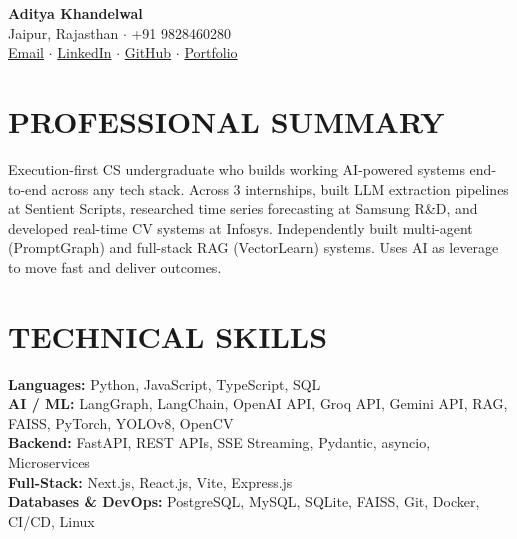 \documentclass[11pt,letterpaper]{article}
\newcommand{\skill}[2]{
  \textbf{#1:} #2 \\
}
\begin{document}
\noindent
\begin{minipage}[c]{0.75\textwidth}
    {\huge \textbf{Aditya Khandelwal}} \\[4pt]
    Jaipur, Rajasthan $\cdot$ +91 9828460280 \\[2pt]
    \href{mailto:adityakhandelwal0271@gmail.com}{Email} $\cdot$
    \href{https://www.linkedin.com/in/nvmaditya/}{LinkedIn} $\cdot$
    \href{https://github.com/nvmaditya}{GitHub} $\cdot$
    \href{https://theadityakhandelwal.in/}{Portfolio}
\end{minipage}%

\vspace{2.5pt}

\section{PROFESSIONAL SUMMARY}
Execution-first CS undergraduate who builds working AI-powered systems end-to-end across any tech stack. Across 3 internships, built LLM extraction pipelines at Sentient Scripts, researched time series forecasting at Samsung R\&D, and developed real-time CV systems at Infosys. Independently built multi-agent (PromptGraph) and full-stack RAG (VectorLearn) systems. Uses AI as leverage to move fast and deliver outcomes.

\section{TECHNICAL SKILLS}
\skill{Languages}{Python, JavaScript, TypeScript, SQL}
\skill{AI / ML}{LangGraph, LangChain, OpenAI API, Groq API, Gemini API, RAG, FAISS, PyTorch, YOLOv8, OpenCV}
\skill{Backend}{FastAPI, REST APIs, SSE Streaming, Pydantic, asyncio, Microservices}
\skill{Full-Stack}{Next.js, React.js, Vite, Express.js}
\skill{Databases \& DevOps}{PostgreSQL, MySQL, SQLite, FAISS, Git, Docker, CI/CD, Linux}
\end{document}
